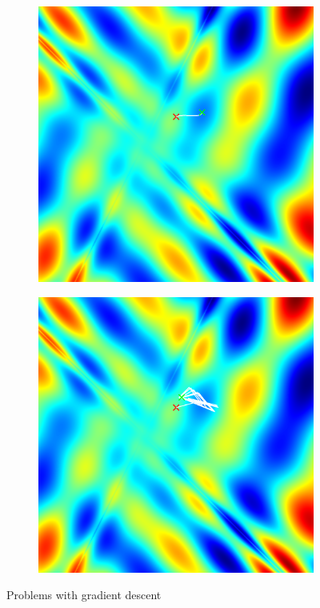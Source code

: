 \documentclass[sigconf,nonacm]{acmart}
\begin{document}
\begin{figure}[h]
  \begin{subfigure}[c]{0.45\columnwidth}
    \includegraphics[width=\textwidth]{local-minimum.png}
  \end{subfigure}
  \begin{subfigure}[c]{0.45\columnwidth}
    \includegraphics[width=\textwidth]{oscillation.png}
  \end{subfigure}
\caption{Problems with gradient descent}
\label{p1:problems}
\end{figure}
\end{document}
